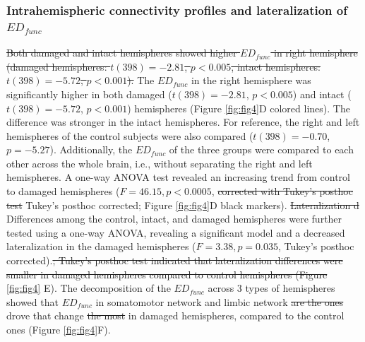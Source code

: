 \documentclass[fleqn,10pt]{wlscirep}
\begin{document}
\subsubsection*{Intrahemispheric connectivity profiles and lateralization of $\textit{ED}_{{func}}$}
\color{red}\st{Both damaged and intact hemispheres showed higher $\textit{ED}_{{func}}$ in right hemisphere (damaged hemispheres: $t(398) = -2.81$, $p<0.005$, intact hemispheres: $t(398) = -5.72$, $p<0.001$).} \color{blue} The $\textit{ED}_{{func}}$ in the right hemisphere was significantly higher in both damaged ($t(398) = -2.81$, $p<0.005$) and intact ($t(398) = -5.72$, $p<0.001$) hemispheres (Figure \ref{fig:fig4}D colored lines). \color{black}The difference was stronger in the intact hemispheres. For reference, the right and left hemispheres of the control subjects were also compared ($t(398) = -0.70$, $p = -5.27$). \color{blue} Additionally, the $\textit{ED}_{{func}}$ of the three groups were compared to each other across the whole brain, i.e., without separating the right and left hemispheres. A one-way ANOVA test revealed an increasing trend from control to damaged hemispheres ($F=46.15, p < 0.0005$, \color{red}\st{corrected with Tukey's posthoc test}\color{blue} Tukey's posthoc corrected; \color{black} Figure \ref{fig:fig4}D black markers). \color{red}\st{Lateralization d}\color{black} Differences among the control, intact, and damaged hemispheres were further tested using a one-way ANOVA, revealing a significant model and a decreased lateralization in the damaged hemispheres ($F = 3.38, p = 0.035$, \color{blue} Tukey's posthoc corrected).\color{red}\st{; Tukey's posthoc test indicated that lateralization differences were smaller in damaged hemispheres compared to control hemispheres (Figure }\ref{fig:fig4} E). \color{black} The decomposition of the $\textit{ED}_{{func}}$ across 3 types of hemispheres showed that $\textit{ED}_{{func}}$ in somatomotor network and limbic network \color{red}\st{are the ones} \color{blue} drove \color{black} that change \color{red}\st{the most} \color{black} in damaged hemispheres, compared to the control ones (Figure \ref{fig:fig4}F). 
 
\end{document}
